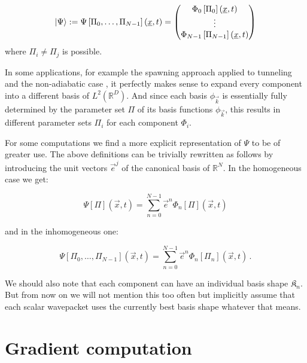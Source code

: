 \begin{definition}
  \begin{equation} \label{eq:vectorial_wavepacket_inhom}
    \Ket{\Psi} :=
    \Psi\left[\Pi_0, \ldots, \Pi_{N-1}\right](\underline{x}, t)
    =
    \begin{pmatrix}
      \Phi_0\left[\Pi_0\right](\underline{x}, t) \\
      \vdots \\
      \Phi_{N-1}\left[\Pi_{N-1}\right](\underline{x}, t) \\
    \end{pmatrix}
  \end{equation}
  where $\Pi_i \neq \Pi_j$ is possible.
\end{definition}

In some applications, for example the spawning approach applied to tunneling
\cite{GHJ_exponentially_accurate} and the non-adiabatic case
\cite{B_spawning_thesis}, it perfectly makes sense to expand every component
into a different basis of $L^2\left(\mathbb{R}^D\right)$. And since each basis
$\phi_{\vec{k}}$ is essentially fully determined by the parameter set $\Pi$ of
its basis functions $\phi_{\vec{k}}$, this results in different parameter sets
$\Pi_i$ for each component $\Phi_i$.

For some computations we find a more explicit representation of $\Psi$ to be
of greater use. The above definitions can be trivially rewritten as follows by
introducing the unit vectors $\vec{e}^j$ of the canonical basis of $\mathbb{R}^N$.
In the homogeneous case we get:

\begin{equation}
  \Psi\left[\Pi\right](\vec{x}, t) = \sum_{n=0}^{N-1} \vec{e}^n \Phi_n\left[\Pi\right](\vec{x}, t)
\end{equation}

and in the inhomogeneous one:

\begin{equation}
  \Psi\left[\Pi_0,\ldots,\Pi_{N-1}\right](\vec{x}, t) = \sum_{n=0}^{N-1} \vec{e}^n \Phi_n\left[\Pi_n\right](\vec{x}, t) \,.
\end{equation}

We should also note that each component can have an individual basis shape $\mathfrak{K}_n$.
But from now on we will not mention this too often but implicitly assume that each
scalar wavepacket uses the currently best basis shape whatever that means.


\section{Gradient computation}
\label{sec:gradient_computation}


